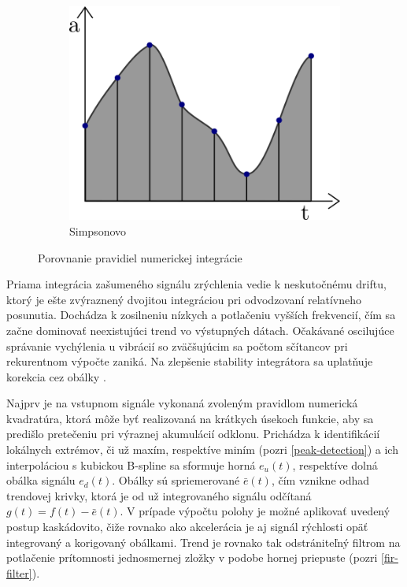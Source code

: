 \begin{figure}[h]
\begin{subfigure}[b]{0.32\textwidth}
    \centering
    \includegraphics[width=\textwidth]{figures/simpson-rule.png}
    \caption{Simpsonovo}
    \label{fig:simpson-rule}
\end{subfigure}
\caption{Porovnanie pravidiel numerickej integrácie}
\end{figure}

Priama integrácia zašumeného signálu zrýchlenia vedie k neskutočnému driftu, ktorý je ešte zvýraznený dvojitou integráciou pri
odvodzovaní relatívneho posunutia. Dochádza k zosilneniu nízkych a potlačeniu vyšších frekvencií, čím sa začne dominovať neexistujúci
trend vo výstupných dátach. Očakávané oscilujúce správanie vychýlenia u vibrácií so zväčšujúcim sa počtom sčítancov pri rekurentnom
výpočte zaniká. Na zlepšenie stability integrátora sa uplatňuje korekcia cez obálky \cite{integration-acceleration-envelopes}.

Najprv je na vstupnom signále vykonaná zvoleným pravidlom numerická kvadratúra, ktorá môže byť realizovaná na krátkych
úsekoch funkcie, aby sa predišlo pretečeniu pri výraznej akumulácií odklonu. Prichádza k identifikácií lokálnych extrémov, či už maxím,
respektíve miním (pozri \ref{peak-detection}) a ich interpoláciou s kubickou B-spline sa sformuje horná $e_u(t)$, respektíve dolná
obálka signálu $e_d(t)$. Obálky sú spriemerované $\bar{e}(t)$, čím vznikne odhad trendovej krivky, ktorá je od už integrovaného
signálu odčítaná $g(t) = f(t) - \bar{e}(t)$. V prípade výpočtu polohy je možné aplikovať uvedený postup kaskádovito, čiže rovnako
ako akcelerácia je aj signál rýchlosti opäť integrovaný a korigovaný obálkami. Trend je rovnako tak odstrániteľný filtrom na
potlačenie prítomnosti jednosmernej zložky v podobe hornej priepuste (pozri \ref{fir-filter}).

